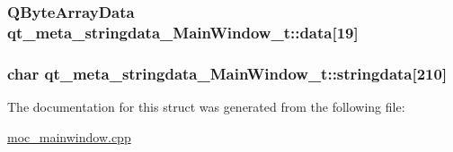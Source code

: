\subsubsection[{data}]{\setlength{\rightskip}{0pt plus 5cm}Q\+Byte\+Array\+Data qt\+\_\+meta\+\_\+stringdata\+\_\+\+Main\+Window\+\_\+t\+::data\mbox{[}19\mbox{]}}\label{structqt__meta__stringdata___main_window__t_afd67093eee085680898ad79aa678a6fe}
\hypertarget{structqt__meta__stringdata___main_window__t_a068b561b746276a78c37d2aad850d37b}{}
\subsubsection[{stringdata}]{\setlength{\rightskip}{0pt plus 5cm}char qt\+\_\+meta\+\_\+stringdata\+\_\+\+Main\+Window\+\_\+t\+::stringdata\mbox{[}210\mbox{]}}\label{structqt__meta__stringdata___main_window__t_a068b561b746276a78c37d2aad850d37b}


The documentation for this struct was generated from the following file\+:\begin{DoxyCompactItemize}
\item 
\hyperlink{moc__mainwindow_8cpp}{moc\+\_\+mainwindow.\+cpp}\end{DoxyCompactItemize}
